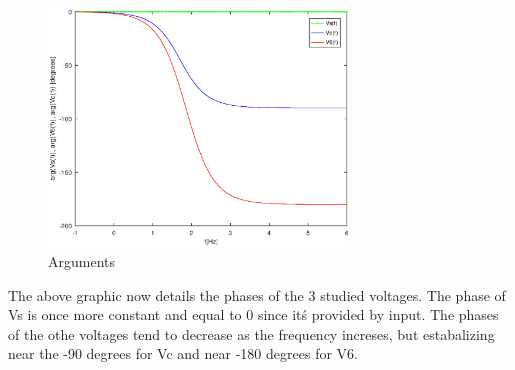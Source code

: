 \begin{figure}[H]
\centering
\includegraphics[width = 8cm]{Arguments.eps}
\caption {Arguments}
\end{figure}

The above graphic now details the phases of the 3 studied voltages. The phase of Vs is once more constant and equal to 0 since itś provided by input. The phases of the othe voltages tend to decrease as the frequency increses, but estabalizing near the -90 degrees for Vc and near -180 degrees for V6.  




